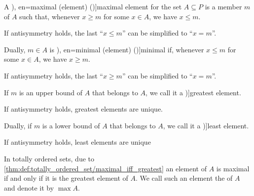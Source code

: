 \begin{definition}
\begin{thmenum}
    \begin{paracol}{2}
      \begin{leftcolumn}\mimprovised
        A \term[ru=максимальный (елемент) (\cite[def. 3.6]{Гуров2013ТеорияРешёток}), en=maximal (element) (\cite[33]{Harzheim2005OrderedSets})]{maximal element} for the set \( A \subseteq P \) is a member \( m \) of \( A \) such that, whenever \( x \geq m \) for some \( x \in A \), we have \( x \leq m \).

        If antisymmetry holds, the last \enquote{\( x \leq m \)} can be simplified to \enquote{\( x = m \)}.
      \end{leftcolumn}

      \begin{rightcolumn}
        Dually, \( m \in A \) is \term[ru=минимальный (елемент) (\cite[def. 3.6]{Гуров2013ТеорияРешёток}), en=minimal (element) (\cite[33]{Harzheim2005OrderedSets})]{minimal} if, whenever \( x \leq m \) for some \( x \in A \), we have \( x \geq m \).

        If antisymmetry holds, the last \enquote{\( x \geq m \)} can be simplified to \enquote{\( x = m \)}.
      \end{rightcolumn}
    \end{paracol}

    \begin{paracol}{2}
      \begin{leftcolumn}
        If \( m \) is an upper bound of \( A \) that belongs to \( A \), we call it a \term[ru=наибольший (елемент) (\cite[def. 3.6]{Гуров2013ТеорияРешёток})]{greatest element}.

        If antisymmetry holds, greatest elements are unique.
      \end{leftcolumn}

      \begin{rightcolumn}
        Dually, if \( m \) is a lower bound of \( A \) that belongs to \( A \), we call it a \term[ru=наименьший (елемент) (\cite[def. 3.6]{Гуров2013ТеорияРешёток})]{least element}.

        If antisymmetry holds, least elements are unique
      \end{rightcolumn}
    \end{paracol}

    \begin{paracol}{2}
      \begin{leftcolumn}\mimprovised
        In totally ordered sets, due to \cref{thm:def:totally_ordered_set/maximal_iff_greatest} an element of \( A \) is maximal if and only if it is the greatest element of \( A \). We call such an element the  of \( A \) and denote it by \( \max A \).
      \end{leftcolumn}


\end{paracol}
\end{thmenum}
\end{definition}

